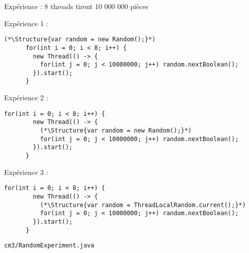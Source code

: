 
\begingroup

\begin{frame}[fragile]{Expérience : 8 threads tirent 10 000 000 pièces}

  \vspace{-3mm}
  \begin{block}{Expérience 1 : }\vspace{-3mm}
    \begin{lstlisting}[gobble=4]
      (*\Structure{var random = new Random();}*)
      for(int i = 0; i < 8; i++) {
        new Thread(() -> {
          for(int j = 0; j < 10000000; j++) random.nextBoolean();
        }).start();
      }
    \end{lstlisting}
  \end{block}

  \vspace{-3mm}
  \begin{block}{Expérience 2 : }\vspace{-3mm}
    \begin{lstlisting}[gobble=4]
      for(int i = 0; i < 8; i++) {
        new Thread(() -> {
          (*\Structure{var random = new Random();}*)
          for(int j = 0; j < 10000000; j++) random.nextBoolean();
        }).start();
      }
    \end{lstlisting}
  \end{block}

  \vspace{-3mm}
  \begin{block}{Expérience 3 : }\vspace{-3mm}
    \begin{lstlisting}[gobble=4]
      for(int i = 0; i < 8; i++) {
        new Thread(() -> {
          (*\Structure{var random = ThreadLocalRandom.current();}*)
          for(int j = 0; j < 10000000; j++) random.nextBoolean();
        }).start();
      }
    \end{lstlisting}
  \end{block}

  \vspace{-3mm}
  \begin{citing}
    \jitem \lstinline{cm3/RandomExperiment.java}
  \end{citing}

\end{frame}

\endgroup
\endinput
